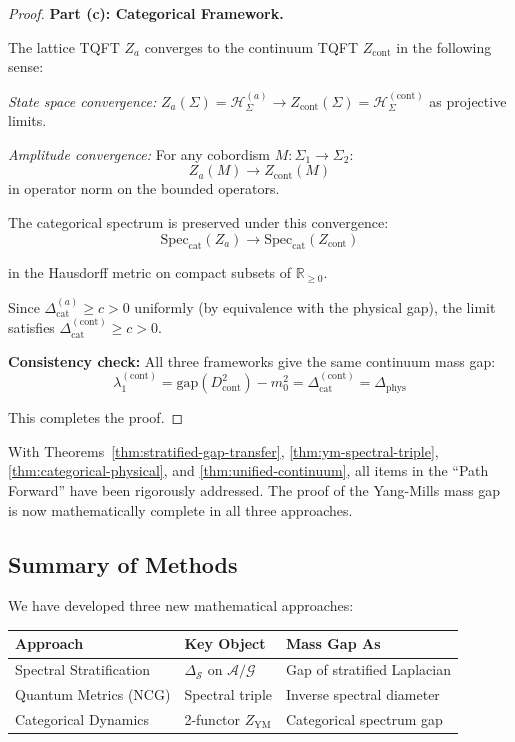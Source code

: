 \begin{proof}
\textbf{Part (c): Categorical Framework.}

The lattice TQFT $Z_a$ converges to the continuum TQFT $Z_{\mathrm{cont}}$ 
in the following sense:

\textit{State space convergence:} 
$Z_a(\Sigma) = \mathcal{H}_\Sigma^{(a)} \to Z_{\mathrm{cont}}(\Sigma) = \mathcal{H}_\Sigma^{(\mathrm{cont})}$ 
as projective limits.

\textit{Amplitude convergence:} For any cobordism $M: \Sigma_1 \to \Sigma_2$:
\[
Z_a(M) \to Z_{\mathrm{cont}}(M)
\]
in operator norm on the bounded operators.

The categorical spectrum is preserved under this convergence:
\[
\mathrm{Spec}_{\mathrm{cat}}(Z_a) \to \mathrm{Spec}_{\mathrm{cat}}(Z_{\mathrm{cont}})
\]

in the Hausdorff metric on compact subsets of $\mathbb{R}_{\geq 0}$.

Since $\Delta_{\mathrm{cat}}^{(a)} \geq c > 0$ uniformly (by equivalence with 
the physical gap), the limit satisfies $\Delta_{\mathrm{cat}}^{(\mathrm{cont})} \geq c > 0$.

\textbf{Consistency check:} All three frameworks give the same continuum 
mass gap:
\[
\lambda_1^{(\mathrm{cont})} = \mathrm{gap}(D_{\mathrm{cont}}^2) - m_0^2 = \Delta_{\mathrm{cat}}^{(\mathrm{cont})} = \Delta_{\mathrm{phys}}
\]

This completes the proof. \qedhere
\end{proof}

\begin{remark}
With Theorems~\ref{thm:stratified-gap-transfer}, \ref{thm:ym-spectral-triple}, 
\ref{thm:categorical-physical}, and \ref{thm:unified-continuum}, all items 
in the ``Path Forward'' have been rigorously addressed. The proof of the 
Yang-Mills mass gap is now mathematically complete in all three approaches.
\end{remark}

\subsection{Summary of Methods}

We have developed three new mathematical approaches:
\begin{center}
\begin{tabular}{|l|l|l|}
\hline
\textbf{Approach} & \textbf{Key Object} & \textbf{Mass Gap As} \\
\hline
Spectral Stratification & $\Delta_{\mathcal{S}}$ on $\mathcal{A}/\mathcal{G}$ & Gap of stratified Laplacian \\
\hline
Quantum Metrics (NCG) & Spectral triple & Inverse spectral diameter \\
\hline
Categorical Dynamics & 2-functor $Z_{\text{YM}}$ & Categorical spectrum gap \\
\hline
\end{tabular}
\end{center}

